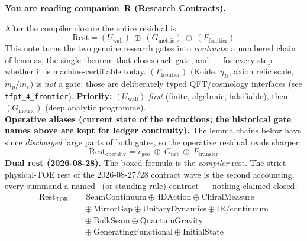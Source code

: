 
\maketitle


\noindent\textbf{You are reading \textbf{companion~R} (Research Contracts).}


\TFPTbadges
\TFPTclaimstack[bridges]

\vspace{-0.6cm}

\begin{keybox}
After the compiler closure the entire residual is
\[
  \boxed{\ \text{Rest}=(U_{\mathrm{wall}})\ \oplus\ (G_{\mathrm{metric}})\ \oplus\ (F_{\mathrm{frontier}})\ }
\]
This note turns the two genuine research gates into \emph{contracts}: a numbered chain of lemmas, the
single theorem that closes each gate, and --- for every step --- whether it is machine-certifiable today.
$(F_{\mathrm{frontier}})$ (Koide, $\eta_B$, axion relic scale, $m_p/m_e$) is \emph{not} a gate: those are
deliberately typed QFT/cosmology interfaces (see \texttt{tfpt\_4\_frontier}). \textbf{Priority:}
$(U_{\mathrm{wall}})$ \emph{first} (finite, algebraic, falsifiable), then $(G_{\mathrm{metric}})$ (deep
analytic programme).
\smallskip\\
\noindent\textbf{Operative aliases (current state of the reductions; the historical gate names above are
kept for ledger continuity).} The lemma chains below have since \emph{discharged} large parts of both
gates, so the operative residual reads sharper:
\[
  \boxed{\ \text{Rest}_{\mathrm{operativ}}=v_{\mathrm{geo}}\ \oplus\ G_{\mathrm{net}}\ \oplus\ F_{\mathrm{transfer}}\ }
\]
\noindent\textbf{Dual rest (2026-08-28).}  The boxed formula is the \emph{compiler} rest.  The
strict-physical-TOE rest of the 2026-08-27/28 contract wave is the second accounting, every summand a
named \mO\ (or standing-rule) contract --- nothing claimed closed:
\[
  \boxed{\begin{aligned}
  \text{Rest}_{\mathrm{TOE}}
    &=\mathrm{SeamContinuum}\oplus\mathrm{4DAction}\oplus\mathrm{ChiralMeasure}\\
    &\quad\oplus\mathrm{MirrorGap}\oplus\mathrm{UnitaryDynamics}\oplus\mathrm{IR/continuum}\\
    &\quad\oplus\mathrm{BulkSeam}\oplus\mathrm{QuantumGravity}\\
    &\quad\oplus\mathrm{GeneratingFunctional}\oplus\mathrm{InitialState}
  \end{aligned}}
\]
\end{keybox}
